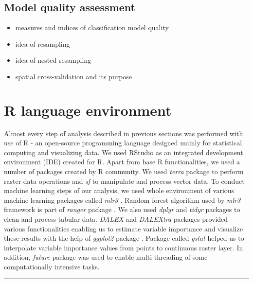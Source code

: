 \documentclass{amuthesis}
\begin{document}
\hypertarget{sec-resampling}{%
\subsection{Model quality assessment}\label{sec-resampling}}

\begin{itemize}
\item
  measures and indices of classification model quality
\item
  idea of resampling
\item
  idea of nested resampling
\item
  spatial cross-validation and its purpose
\end{itemize}

\hypertarget{sec-r}{%
\section{R language environment}\label{sec-r}}

Almost every step of analysis described in previous sections was
performed with use of R \autocite{R-base} - an open-source programming
language designed mainly for statistical computing and visualizing data.
We used RStudio \autocite{R-studio} as an integrated development
environment (IDE) created for R. Apart from base R functionalities, we
used a number of packages created by R community. We used \emph{terra}
package \autocite{R-terra} to perform raster data operations and
\emph{sf} \autocite{R-sf} to manipulate and process vector data. To
conduct machine learning steps of our analysis, we used whole
environment of various machine learning packages called \emph{mlr3}
\autocite{R-mlr3}. Random forest algorithm used by \emph{mlr3} framework
is part of \emph{ranger} package \autocite{R-ranger} . We also used
\emph{dplyr} and \emph{tidyr} packages \autocite{R-dplyr} to clean and
process tabular data. \emph{DALEX} and \emph{DALEXtra}
\autocite{R-DALEX} packages provided various functionalities enabling us
to estimate variable importance and visualize these results with the
help of \emph{ggplot2} package \autocite{R-ggplot2}. Package called
\emph{gstat} \autocite{R-gstat} helped us to interpolate variable
importance values from points to continuous raster layer. In addition,
\emph{future} package \autocite{R-future} was used to enable
multi-threading of some computationally intensive tasks.

\begin{center}\rule{0.5\linewidth}{0.5pt}\end{center}
\end{document}
